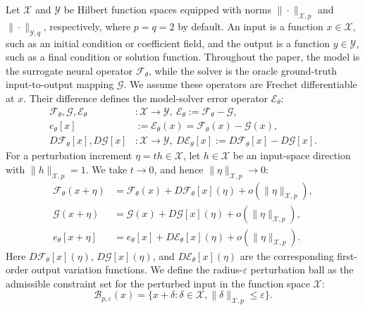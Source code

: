 \documentclass[letterpaper]{article} %
\begin{document}
Let $\mathcal{X}$ and $\mathcal{Y}$ be Hilbert function spaces equipped with
norms $\|\cdot\|_{\mathcal{X},p}$ and $\|\cdot\|_{\mathcal{Y},q}$, respectively,
where $p=q=2$ by default. An input is a function $x\in\mathcal{X}$, such as an
initial condition or coefficient field, and the output is a function
$y\in\mathcal{Y}$, such as a final condition or solution function. Throughout
the paper, the model is the surrogate neural
operator $\mathcal{F}_\theta$, while the solver is the oracle ground-truth
input-to-output mapping $\mathcal{G}$. We assume these operators are Frechet
differentiable at $x$. Their difference defines the
model-solver error operator $\mathcal{E}_\theta$:
\begin{equation*}
\begin{aligned}
  \mathcal{F}_\theta,\mathcal{G},\mathcal{E}_\theta
  &:\mathcal{X}\to\mathcal{Y},\
  \mathcal{E}_\theta:=\mathcal{F}_\theta-\mathcal{G},\\
  e_\theta[x]
  &:=
  \mathcal{E}_\theta(x)
  =
  \mathcal{F}_\theta(x)-\mathcal{G}(x),\\
  D\mathcal{F}_\theta[x],D\mathcal{G}[x]
  &:\mathcal{X}\to\mathcal{Y},\
  D\mathcal{E}_\theta[x]:=D\mathcal{F}_\theta[x]-D\mathcal{G}[x].
\end{aligned}
\end{equation*}
For a perturbation increment $\eta=t h\in\mathcal{X}$, let $h\in\mathcal{X}$ be an
input-space direction with $\|h\|_{\mathcal{X},p}=1$. We take $t\to0$, and hence
$\|\eta\|_{\mathcal{X},p}\to0$:
\begin{align*}
  \mathcal{F}_\theta(x+\eta)
  &=
  \mathcal{F}_\theta(x)+D\mathcal{F}_\theta[x](\eta)
  +o(\|\eta\|_{\mathcal{X},p}),
  \\
  \mathcal{G}(x+\eta)
  &=
  \mathcal{G}(x)+D\mathcal{G}[x](\eta)
  +o(\|\eta\|_{\mathcal{X},p}),
  \\
  e_\theta[x+\eta]
  &=
  e_\theta[x]+D\mathcal{E}_\theta[x](\eta)
  +o(\|\eta\|_{\mathcal{X},p}).
\end{align*}
Here $D\mathcal{F}_\theta[x](\eta)$, $D\mathcal{G}[x](\eta)$, and
$D\mathcal{E}_\theta[x](\eta)$ are the corresponding first-order output
variation functions.
We define the radius-$\varepsilon$ perturbation ball as the admissible
constraint set for the perturbed input in the function space $\mathcal{X}$:
\begin{equation*}
  \mathcal{B}_{p,\varepsilon}(x)
  =
  \{x+\delta:\delta\in\mathcal{X},
  \|\delta\|_{\mathcal{X},p}\le\varepsilon\}.
\end{equation*}
\end{document}

